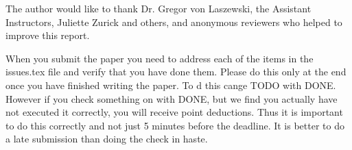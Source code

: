\documentclass[sigconf]{acmart}
\begin{document}
\begin{acks}

    The author would like to thank Dr. Gregor von Laszewski, 
    the Assistant Instructors, Juliette Zurick and others, and 
    anonymous reviewers who helped to improve this report. 

\end{acks}


 

\appendix

When you submit the paper you need to address each of the items in the
issues.tex file and verify that you have done them. Please do this
only at the end once you have finished writing the paper. To d this
cange TODO with DONE. However if you check something on with DONE, but
we find you actually have not executed it correctly, you will receive
point deductions. Thus it is important to do this correctly and not
just 5 minutes before the deadline. It is better to do a late
submission than doing the check in haste. 

%
\end{document}
